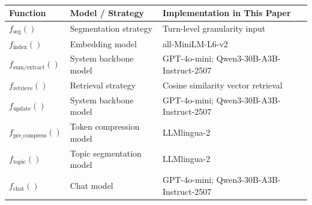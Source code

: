 \begin{table}[ht]
{\begin{threeparttable}
\begin{tabular}{@{}lccc@{}}
\\


\bottomrule
\end{tabular}
\end{threeparttable}
}
\label{tab:detail_process}
\end{table}

\begin{table}[ht]
\centering
\renewcommand{\arraystretch}{1.2}
\begin{tabular}{l l l}
\hline
\textbf{Function} & \textbf{Model / Strategy} & \textbf{Implementation in This Paper} \\
\hline
$f_{\text{seg}}()$ & Segmentation strategy & Turn-level granularity input \\
$f_{\text{index}}()$ & Embedding model & all-MiniLM-L6-v2 \\
$f_{\text{sum/extract}}()$ & System backbone model & GPT-4o-mini; Qwen3-30B-A3B-Instruct-2507 \\
$f_{\text{retrieve}}()$ & Retrieval strategy & Cosine similarity vector retrieval \\
$f_{\text{update}}()$ & System backbone model & GPT-4o-mini; Qwen3-30B-A3B-Instruct-2507 \\
\color{red}$f_{\text{pre\_compress}}()$ & \color{red}Token compression model & \color{red}LLMlingua-2 \\
\color{red}$f_{\text{topic}}()$ & \color{red}Topic segmentation model & \color{red}LLMlingua-2 \\
$f_{\text{chat}}()$ & Chat model & GPT-4o-mini; Qwen3-30B-A3B-Instruct-2507 \\
\hline
\end{tabular}
\caption{}
\label{tab:function_model_map}
\end{table}

\paragraph{}



